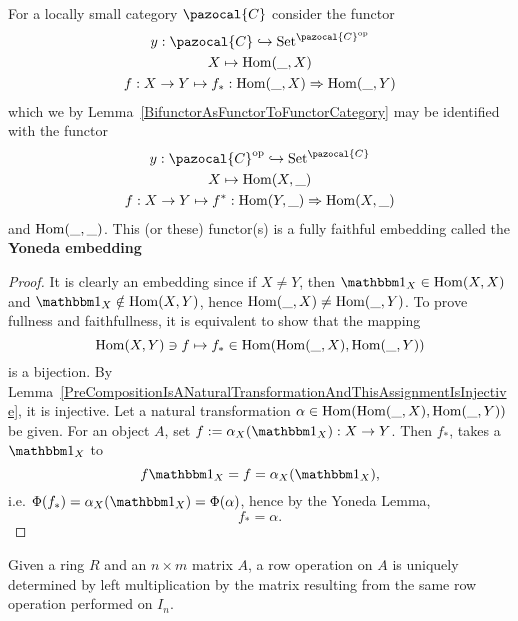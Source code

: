 \begin{corollary}\label{YonedaEmbedding}
    For a locally small category $\pazocal{C}$ consider the functor
    \begin{gather*}
        y: \pazocal{C} \hookrightarrow \mathrm{Set}^{\pazocal{C}\op}\\
        X \mapsto \Hom(\_,X)\\
        f : X\rightarrow Y \mapsto f_\ast : \Hom(\_,X)\Rightarrow \Hom(\_,Y)
    \end{gather*}
    which we by Lemma~\ref{BifunctorAsFunctorToFunctorCategory} may be identified with the functor 
    \begin{gather*}
        y: \pazocal{C}\op \hookrightarrow \mathrm{Set}^{\pazocal{C}}\\
        X \mapsto \Hom(X,\_)\\
        f : X\rightarrow Y \mapsto f^\ast : \Hom(Y,\_)\Rightarrow \Hom(X,\_)
    \end{gather*}
    and $\mathrm{Hom}(\_,\_)$. This (or these) functor(s) is a fully faithful embedding called the \textbf{Yoneda embedding}
\end{corollary}
\begin{proof}
    It is clearly an embedding since if $X\neq Y$, then $\fone_X\in \Hom(X,X)$ and $\fone_X\notin \Hom(X,Y)$, hence $\mathrm{Hom}(\_,X)\neq \mathrm{Hom}(\_,Y)$. To prove fullness and faithfullness, it is equivalent to show that the mapping 
    $$
        \mathrm{Hom}(X,Y)\ni f \mapsto f_\ast\in \mathrm{Hom}(\mathrm{Hom}(\_,X),\mathrm{Hom}(\_,Y))
    $$
    is a bijection. By Lemma~\ref{PreCompositionIsANaturalTransformationAndThisAssignmentIsInjective}, it is injective. Let a natural transformation $\alpha\in \mathrm{Hom}(\mathrm{Hom}(\_,X),\mathrm{Hom}(\_,Y))$ be given. For an object $A$, set $f:= \alpha_X(\fone_X) : X \rightarrow Y$. Then $f_\ast$, takes a $\fone_X$ to 
    $$f\fone_X = f = \alpha_X(\fone_X),$$
    i.e. $\Phi(f_\ast)=\alpha_X(\fone_X)=\Phi(\alpha)$, hence by the Yoneda Lemma, 
    $$f_\ast = \alpha.$$

\end{proof}
\begin{corollary}
    Given a ring $R$ and an $n\times m$ matrix $A$, a row operation on $A$ is uniquely determined by left multiplication by the matrix resulting from the same row operation performed on $I_n$. 
\end{corollary}
